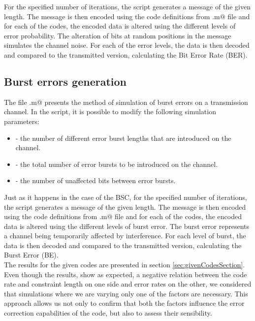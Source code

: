 For the specified number of iterations, the script generates a message of the given length. The message is then encoded using the code definitions from \verb@trellisGenerator.m@ file and for each of the codes, the encoded data is altered using the different levels of error probability. The alteration of bits at random positions in the message simulates the channel noise. For each of the error levels, the data is then decoded and compared to the transmitted version, calculating the Bit Error Rate (BER).

\subsection{Burst errors generation}

The file \verb@burstErrors.m@ presents the method of simulation of burst errors on a transmission channel. In the script, it is possible to modify the following simulation parameters:

\begin{itemize}
   \item \verb@BurstLevels@ - the number of different error burst lengths that are introduced on the channel. 
   \item \verb@nBursts@ - the total number of error bursts to be introduced on the channel.
   \item \verb@burstSep@ - the number of unaffected bits between error bursts.
\end{itemize}

Just as it happens in the case of the BSC, for the specified number of iterations, the script generates a message of the given length. The message is then encoded using the code definitions from \verb@trellisGenerator.m@ file and for each of the codes, the encoded data is altered using the different levels of burst error. The burst error represents a channel being temporarily affected by interference. For each level of burst, the data is then decoded and compared to the transmitted version, calculating the Burst Error (BE).
\\[8pt]

The results for the given codes are presented in section \ref{sec:givenCodesSection}. Even though the results, show as expected, a negative relation between the code rate and constraint length on one side and error rates on the other, we considered that simulations where we are varying only one of the factors are necessary. This approach allows us not only to confirm that both the factors influence the error correction capabilities of the code, but also to assess their sensibility.

